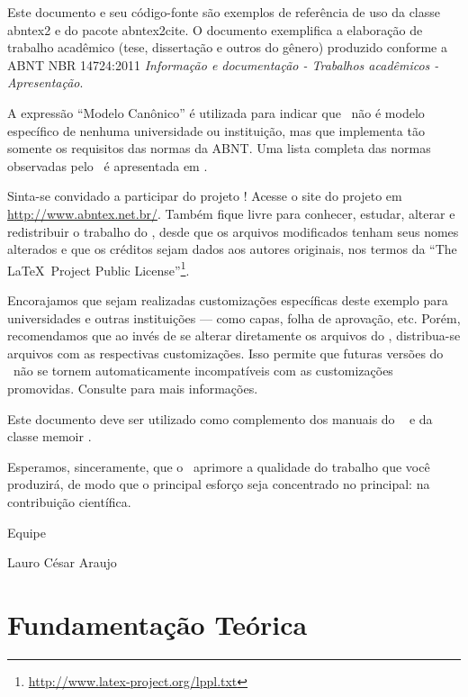 \documentclass[
	12pt,				%
	openright,			%
	twoside,			%
	a4paper,			%
	english,			%
	brazil				%
	]{abntex2}
\begin{document}
Este documento e seu código-fonte são exemplos de referência de uso da classe
\textsf{abntex2} e do pacote \textsf{abntex2cite}. O documento 
exemplifica a elaboração de trabalho acadêmico (tese, dissertação e outros do
gênero) produzido conforme a ABNT NBR 14724:2011 \emph{Informação e documentação
- Trabalhos acadêmicos - Apresentação}.

A expressão ``Modelo Canônico'' é utilizada para indicar que \abnTeX\ não é
modelo específico de nenhuma universidade ou instituição, mas que implementa tão
somente os requisitos das normas da ABNT. Uma lista completa das normas
observadas pelo \abnTeX\ é apresentada em \cite{abntex2classe}.

Sinta-se convidado a participar do projeto \abnTeX! Acesse o site do projeto em
\url{http://www.abntex.net.br/}. Também fique livre para conhecer,
estudar, alterar e redistribuir o trabalho do \abnTeX, desde que os arquivos
modificados tenham seus nomes alterados e que os créditos sejam dados aos
autores originais, nos termos da ``The \LaTeX\ Project Public
License''\footnote{\url{http://www.latex-project.org/lppl.txt}}.

Encorajamos que sejam realizadas customizações específicas deste exemplo para
universidades e outras instituições --- como capas, folha de aprovação, etc.
Porém, recomendamos que ao invés de se alterar diretamente os arquivos do
\abnTeX, distribua-se arquivos com as respectivas customizações.
Isso permite que futuras versões do \abnTeX~não se tornem automaticamente
incompatíveis com as customizações promovidas. Consulte
\cite{abntex2-wiki-como-customizar} para mais informações.

Este documento deve ser utilizado como complemento dos manuais do \abnTeX\ 
\cite{abntex2classe,abntex2cite,abntex2cite-alf} e da classe \textsf{memoir}
\cite{memoir}. 

Esperamos, sinceramente, que o \abnTeX\ aprimore a qualidade do trabalho que
você produzirá, de modo que o principal esforço seja concentrado no principal:
na contribuição científica.

Equipe \abnTeX 

Lauro César Araujo

\chapter{Fundamentação Teórica}\label{cap_exemplos}

\end{document}
